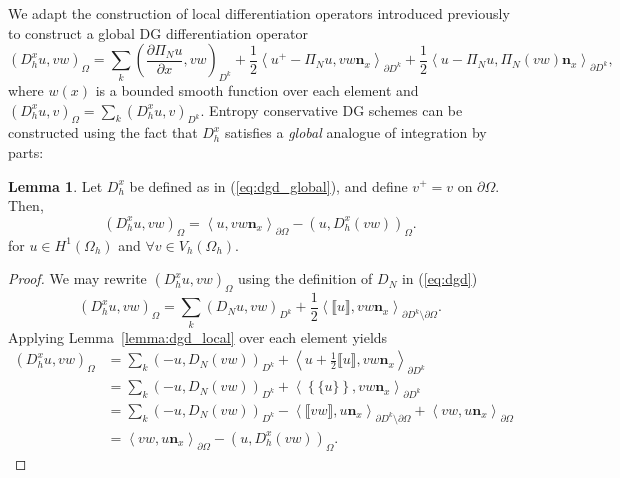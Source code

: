 \documentclass[preprint,10pt]{article}
\theoremstyle{definition}
\theoremstyle{lemma}
\newtheorem{lemma}{Lemma}
\theoremstyle{theorem}
\theoremstyle{assumption}
\newcommand{\pd}[2]{\frac{\partial#1}{\partial#2}}
\newcommand{\LRp}[1]{\left( #1 \right)}
\newcommand{\LRa}[1]{\left\langle #1 \right\rangle}
\newcommand{\LRc}[1]{\left\{ #1 \right\}}
\newcommand{\jump}[1] {\ensuremath{\llbracket#1\rrbracket}}
\newcommand{\avg}[1] {\ensuremath{\LRc{\!\{#1\}\!}}}
\newcommand{\Oh}{{\Omega_h}}
\begin{document}

We adapt the construction of local differentiation operators introduced previously to construct a global DG differentiation operator
\begin{equation}
\LRp{D^x_h u,vw}_{\Omega} = \sum_k \LRp{\pd{ \Pi_N u}{x},vw}_{D^k} + \frac{1}{2}{\LRa{{u^+ - \Pi_N u}, vw\bm{n}_x}_{\partial D^k} + \frac{1}{2}\LRa{{u - \Pi_Nu },\Pi_N(vw) \bm{n}_x}_{\partial D^k}},
\label{eq:dgd_global}
\end{equation}
where $w(x)$ is a bounded smooth function over each element and $\LRp{D^x_h u,v}_{\Omega} = \sum_k \LRp{D^x_h u,v}_{D^k}$.  
Entropy conservative DG schemes can be constructed using the fact that $D^x_h$ satisfies a \textit{global} analogue of integration by parts:
\begin{lemma}
\label{lemma:ibp}
Let $D^x_h$ be defined as in (\ref{eq:dgd_global}), and define $v^+ = v$ on $\partial \Omega$.  Then, 
\[
\LRp{D^x_h u,vw}_{\Omega} = \LRa{u,vw\bm{n}_x}_{\partial \Omega} - \LRp{u,D^x_h (vw)}_{\Omega}.
\]
for $u \in H^1(\Oh)$ and $\forall v\in V_h(\Omega_h)$.  
\end{lemma}
\begin{proof}
We may rewrite $\LRp{D^x_h u,vw}_{\Omega}$ using the definition of $D_N$ in (\ref{eq:dgd})
\[
\LRp{D^x_h u,vw}_{\Omega} = \sum_k \LRp{D_N u,vw}_{D^k} + \frac{1}{2}\LRa{\jump{u},vw\bm{n}_x}_{\partial D^k \setminus \partial \Omega}.  
\]
Applying Lemma~\ref{lemma:dgd_local} over each element yields 
\begin{align*}
\LRp{D^x_h u,vw}_{\Omega} &= \sum_k \LRp{-u,D_N (vw)}_{D^k} + \LRa{u + \frac{1}{2}\jump{u},vw\bm{n}_x}_{\partial D^k}\\
&= \sum_k \LRp{-u,D_N (vw)}_{D^k} + \LRa{\avg{u},vw\bm{n}_x}_{\partial D^k}\\
&= \sum_k \LRp{-u,D_N (vw)}_{D^k} - \LRa{\jump{vw},u\bm{n}_x}_{\partial D^k \setminus \partial \Omega} + \LRa{vw,u\bm{n}_x}_{\partial \Omega} \\
&= \LRa{vw,u\bm{n}_x}_{\partial \Omega}-\LRp{u,D^x_h (vw)}_{\Omega}.    
\end{align*}
\end{proof}
\end{document}
